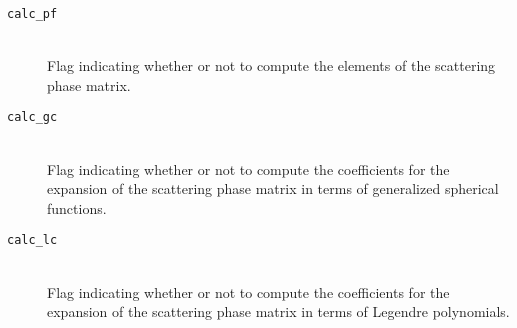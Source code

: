 \begin{description}

\item[\texttt{calc\_pf}] \hfill \\
Flag indicating whether or not to compute the elements of the scattering phase matrix.

\item[\texttt{calc\_gc}] \hfill \\
Flag indicating whether or not to compute the coefficients for the expansion of the scattering phase matrix in terms of generalized spherical functions.

\item[\texttt{calc\_lc}] \hfill \\
Flag indicating whether or not to compute the coefficients for the expansion of the scattering phase matrix in terms of Legendre polynomials.


\end{description}
